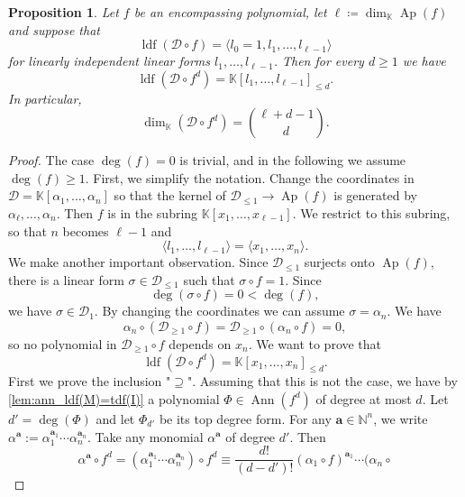 \documentclass[a4paper,11pt,reqno]{amsart}
\newcommand{\bfa}{\mathbf{a}}
\newcommand{\calD}{\mathcal{D}}
\newcommand{\bbK}{\mathbb{K}}
\DeclareMathOperator{\Ann}{Ann}
\DeclareMathOperator{\Ap}{Ap}
\DeclareMathOperator{\ldf}{ldf}
\numberwithin{equation}{section}
\theoremstyle{definition}
\theoremstyle{plain}
\newtheorem{prop}[defn]{Proposition}
\theoremstyle{remark}
\begin{document}
\begin{prop}\label{prop:encompassingImpliesMaximalGrowth}
    Let $f$ be an encompassing polynomial, let $\ell \coloneq \dim_{\bbK} \Ap(f)$ and suppose that
    \[
        \ldf(\calD\circ f) = \langle l_0 = 1, l_1, \ldots , l_{\ell-1}\rangle
    \]
    for linearly independent linear forms $l_1, \ldots , l_{\ell-1}$. Then for
    every $d\geq 1$ we have
    \[
        \ldf(\calD\circ f^d) = \bbK[l_1, \ldots ,l_{\ell-1}]_{\leq d}.
    \]
    In particular, \[\dim_{\bbK} (\calD\circ f^d) = \binom{\ell+d-1}{d}.\]
\end{prop}
\begin{proof}
    The case $\deg(f) = 0$ is trivial, and in the following we assume $\deg(f)\geq 1$.
    {First, we simplify the notation.}
    Change the coordinates in $\calD = \bbK[\alpha_1, \ldots , \alpha_n]$ so that
    the kernel of $\calD_{\leq 1}\to \Ap(f)$ is generated by
    $\alpha_{\ell}, \ldots ,\alpha_n$. Then $f$ {is} in the subring $\bbK[x_1, \ldots
    ,x_{\ell-1}]$. We restrict to this subring, so that $n$ becomes $\ell-1$
    and \[\langle l_1, \ldots , l_{\ell-1} \rangle = \langle x_1, \ldots
    ,x_{n}\rangle.\]
    We make another {important} observation. Since $\calD_{\leq 1}$ surjects
    onto $\Ap(f)$, there is a linear form $\sigma\in \calD_{\leq 1}$ such that
    $\sigma\circ f = 1$. Since \[\deg(\sigma\circ f) = 0 < \deg(f),\] we have
    $\sigma\in \calD_{1}$. By changing the coordinates we can assume $\sigma = \alpha_n$.
    We have
    \[
        \alpha_n\circ(\calD_{\geq 1} \circ f) = \calD_{\geq 1} \circ (\alpha_n
        \circ f) = 0,
    \]
    so no polynomial in $\calD_{\geq 1}\circ f$ depends on $x_n$.
    We want to prove that
    \[
        \ldf( \calD\circ f^d) = \bbK[x_1, \ldots
        ,x_{n}]_{\leq d}.
    \]
    First we prove the inclusion "$\supseteq$". Assuming that this is not the case, we have by \autoref{lem:ann_ldf(M)=tdf(I)} a polynomial $\Phi\in \Ann(f^d)$ of degree at most $d$.
    Let $d' = \deg(\Phi)$ and let $\Phi_{d'}$ be its top
    degree form.
    \newcommand{\oursum}{\sum_{\bfa} \lambda_{\bfa} (\alpha_1\circ f)^{\bfa_1}
    \cdots (\alpha_{n}\circ f)^{\bfa_n}}
    For any $\bfa\in \mathbb{N}^{n}$, we write $\alpha^{\bfa} :=
    \alpha_1^{\bfa_1} \cdots \alpha_{n}^{\bfa_{n}}$.
    Take any monomial $\alpha^{\bfa}$ of degree $d'$. Then
    \begin{equation}\label{eq:action}
        \alpha^{\bfa} \circ f^d = \left( \alpha_1^{\bfa_1}  \cdots
        \alpha_{n}^{\bfa_{n}} \right)\circ f^d \equiv
        \frac{d!}{(d-d')!}(\alpha_{1}\circ f)^{\bfa_1}  \cdots (\alpha_{n}\circ

\end{equation}
\end{proof}
\end{document}
